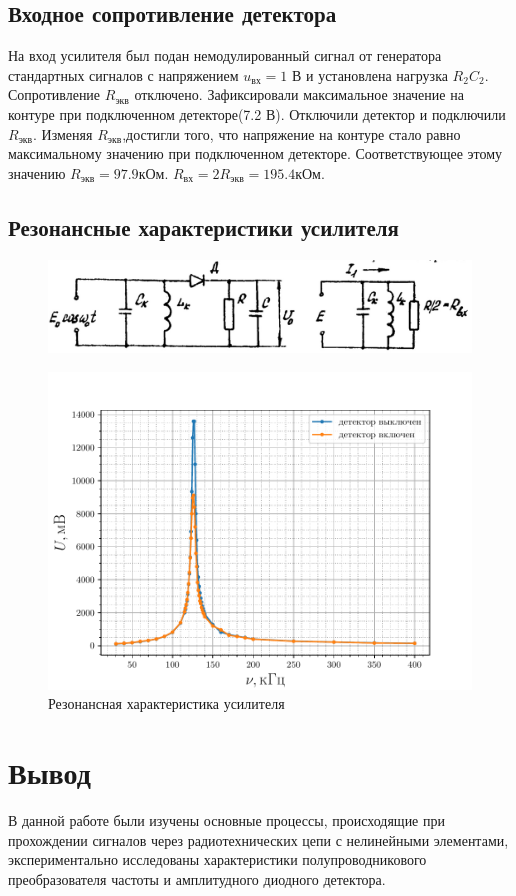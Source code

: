 \subsection{Входное сопротивление детектора}
На вход усилителя был подан немодулированный сигнал от генератора стандартных
сигналов с напряжением $u_{\text{вх}} = 1\text{ В}$ и установлена нагрузка $R_2 C_2$. Сопротивление $R_{\text{экв}}$
отключено. Зафиксировали максимальное значение на контуре при подключенном детекторе(7.2 В). Отключили детектор и
подключили $R_{\text{экв}}$. Изменяя $R_{\text{экв}}$,достигли того, что напряжение на контуре стало равно максимальному
значению при подключенном детекторе. Соответствующее этому значению $R_{\text{экв}} =97.9 \text{кОм}$. $R_{\text{вх}} =
2R_{\text{экв}} = 195.4\text{кОм}$. 

\subsection{Резонансные характеристики усилителя}
 \begin{figure}[H]
	\centering
	\includegraphics[width=\linewidth]{picture/pic12.jpg}
	\caption{}
	\label{pic:12}
\end{figure}

 \begin{figure}[H]
 	\centering
 	\includegraphics[width=\linewidth]{fig/exp3c.pdf}
 	\caption{Резонансная характеристика усилителя}
 	\label{exp:3.4}
 \end{figure}
\section{Вывод}
В данной работе были изучены основные процессы, происходящие при прохождении сигналов через радиотехнических цепи с нелинейными элементами, экспериментально исследованы характеристики полупроводникового преобразователя частоты и амплитудного диодного детектора. 



